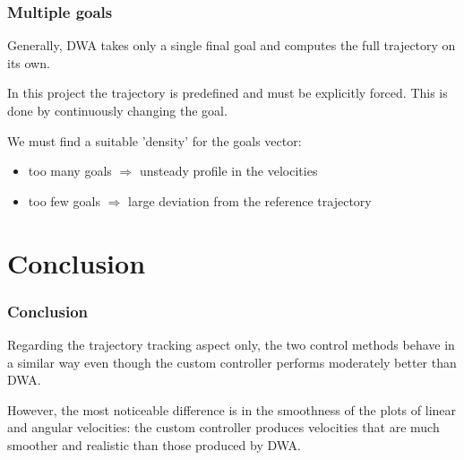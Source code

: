 \documentclass{beamer}
\begin{document}
\begin{frame}
\frametitle{Multiple goals}

Generally, DWA takes only a single final goal and computes the full trajectory
on its own.

\vspace{2em}

In this project the trajectory is predefined and must be explicitly forced.
This is done by continuously changing the goal.

\vspace{2em}

We must find a suitable 'density' for the goals vector:
\begin{itemize}
  \item too many goals $\Rightarrow$ unsteady profile in the velocities
  \item too few goals $\Rightarrow$ large deviation from the reference trajectory
\end{itemize}

\end{frame}




\section{Conclusion}


\begin{frame}
\frametitle{Conclusion}

Regarding the trajectory tracking aspect only, the two control methods behave
in a similar way even though the custom controller performs moderately better
than DWA.

\vspace{2em}

However, the most noticeable difference is in the smoothness of the plots of
linear and angular velocities: the custom controller produces velocities that
are much smoother and realistic than those produced by DWA.

\end{frame}
\end{document}
